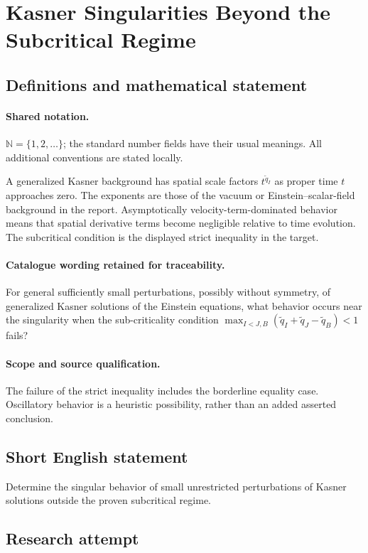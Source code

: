 \documentclass[11pt]{article}
\begin{document}
\section{Kasner Singularities Beyond the Subcritical Regime}\label{statement}

\subsection{Definitions and mathematical statement}

\paragraph{Shared notation.}$\mathbb N=\{1,2,\ldots\}$; the standard number fields have their usual meanings. All additional conventions are stated locally.


A generalized Kasner background has spatial scale factors $t^{\widetilde q_I}$ as proper time $t$ approaches zero. The exponents are those of the vacuum or Einstein--scalar-field background in the report. Asymptotically velocity-term-dominated behavior means that spatial derivative terms become negligible relative to time evolution. The subcritical condition is the displayed strict inequality in the target.

\paragraph{Catalogue wording retained for traceability.}
For general sufficiently small perturbations, possibly without symmetry, of generalized Kasner solutions of the Einstein equations, what behavior occurs near the singularity when the sub-criticality condition $\max_{I<J,B}(\widetilde q_I+\widetilde q_J-\widetilde q_B)<1$ fails?

\paragraph{Scope and source qualification.}The failure of the strict inequality includes the borderline equality case. Oscillatory behavior is a heuristic possibility, rather than an added asserted conclusion.
\subsection{Short English statement}
Determine the singular behavior of small unrestricted perturbations of Kasner solutions outside the proven subcritical regime.
\subsection{Research attempt}
\end{document}
